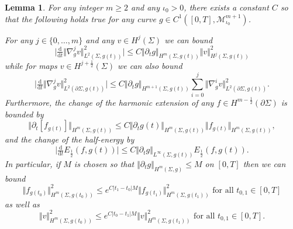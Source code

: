 \documentclass[10pt,reqno]{amsart}
\theoremstyle{plain}
\newtheorem{lemma}{Lemma}[section]
\theoremstyle{definition}
\numberwithin{equation}{section}
\newcommand{\Si}{\Sigma}
\newcommand{\norm}[1]{\Vert#1\Vert}
\newcommand{\half}{\frac{1}{2}}
\newcommand{\dd}{\mathrm{d}} %
\newcommand{\abs}[1]{\vert#1\vert}
\newcommand{\MM}{\mathcal{M}} %
\newcommand{\hf}{\frac{1}{2}} %
\newcommand{\p}{\partial} %
\newcommand{\MMiota}{\MM_{\iota_0}}
\begin{document}
\begin{lemma}\label{lemma:metric_variations}
	For any integer $m \geq 2$ and any $\iota_0>0$, there exists a constant $C$ so that the following holds true for any curve $g\in C^1([0,T],\MMiota^{m+1})$. 
    
    For any $j\in \{0,\ldots, m\}$ and any $v\in H^j(\Si)$ we can bound \begin{equation}\label{est:metric_variation_sobolev_norm}
        \abs{\tfrac{\dd}{\dd t}\norm{\nabla_{g}^j v}_{L^2(\Si,g(t))}^2} \leq C\norm{\p_t g}_{H^{m}(\Si,g(t))}\norm{v}_{H^j(\Si,g(t))}^2
	\end{equation}
    while for maps $v\in H^{j+\half}(\Si)$ we can also bound 
    \begin{equation}\label{est:boundary_norm_variation}
        \abs{\tfrac{\dd}{\dd t}\norm{\nabla_{g}^j v}_{L^2(\p\Si,g(t))}^2} \leq C\norm{\p_t g}_{H^{m+1}(\Si,g(t))}\sum_{i=0}^j\norm{\nabla_{g}^i v}_{L^2(\p\Si,g(t))}^2.
	\end{equation}
    Furthermore, the change of the harmonic extension of any $f \in H^{m-\hf}(\p\Si)$ is bounded by 
    \begin{equation}\label{est:he_ddt}
        \norm{\p_t [f_{g(t)}]}_{H^m(\Si,g(t))} \leq C\norm{\p_t g(t)}_{H^{m}(\Si,g(t))}\norm{f_{g(t)}}_{H^m(\Si,g(t))},
	\end{equation}
    and the change of the half-energy by
    \begin{equation}\label{est:g_change_E}
        \abs{\tfrac{\dd}{\dd t}E_\hf(f,g(t))}\leq C\norm{\p_t g}_{L^\infty(\Si,g(t))} E_\hf(f,g(t)).
	\end{equation} 
    In particular, if $M$ is chosen so that $\norm{\p_t g }_{H^{m}(\Si,g)}\leq M$ on $[0,T]$ then we can bound 
    \begin{equation}\label{est:harm-ext-timedep-gen} 
		\norm{f_{g(t_0)}}_{H^m(\Si,g(t_0))}^2
		\le e^{C\abs{t_1-t_0}M}\norm{f_{g(t_1)}}_{H^m(\Si,g(t_1))}^2 \text{ for all }t_{0,1}\in [0,T]
	\end{equation} 
	as well as \begin{equation}\label{est:metric_variation_sobolev_norm_integrated}
        \norm{v}_{H^m(\Si,g(t_0))}^2\le e^{C\abs{t_0-t_1}M}\norm{v}_{H^m(\Si,g(t_1))}^2 \text{ for all }t_{0,1}\in [0,T].
	\end{equation}
\end{lemma}
\end{document}
